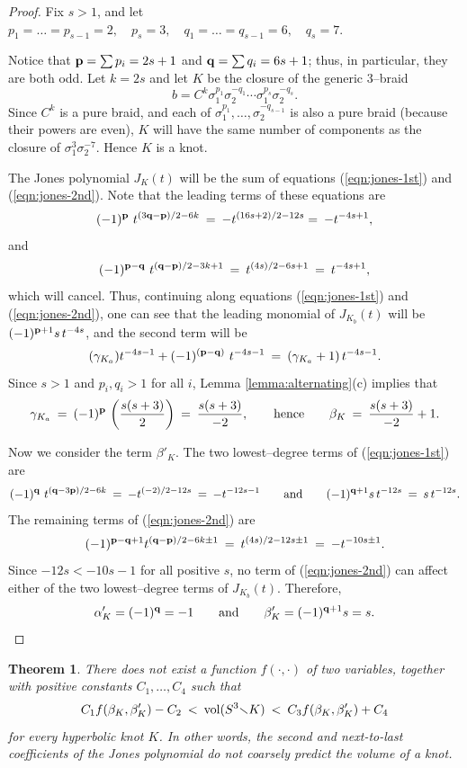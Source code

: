 \documentclass[11pt]{amsart}
\renewcommand{\setminus}{{\smallsetminus}}
\newcommand{\vol}{{\rm vol}}
\newcommand{\p}{{\bf p}}
\newcommand{\q}{{\bf q}}
\theoremstyle{plain}
\newtheorem{theorem}{Theorem}[section]
\theoremstyle{definition}
\begin{document}
\begin{proof} 
Fix $s>1$, and let
$p_1 = \ldots = p_{s-1} = 2, \quad p_s = 3, \quad
q_1 = \ldots = q_{s-1} = 6, \quad q_s = 7.$

Notice that $\p = \sum p_i=2s+1$ and $\q = \sum
q_i=6s+1$; thus, in particular, they are both odd.  Let $k=2s$
and let $K$ be the closure of the generic $3$--braid
$$b= C^k \sigma_1^{p_1} \sigma_2^{-q_1} \cdots \sigma_1^{p_s}
\sigma_2^{-q_s}.$$
%
Since $C^k$ is a pure braid, and each of $\sigma_1^{p_1}, \ldots,
\sigma_2^{-q_{s-1}}$ is also a pure braid (because their powers are
even), $K$ will have the same number of components as the closure of
$\sigma_1^{3} \sigma_2^{-7}$.  Hence $K$ is a knot.
 
The Jones polynomial $J_K(t)$ will be the sum of equations
(\ref{eqn:jones-1st}) and (\ref{eqn:jones-2nd}). Note that the leading
terms of these equations are
$$(-1)^{\p} \ t^{(3\q-\p)/2-6k} \: = \: -t^{(16s+2)/2-12s} =\: - t^{-4s+1}, $$
%
and
$$(-1)^{\p-\q} \  t^{(\q-\p)/2-3k+1} \: = \: t^{(4s)/2-6s+1} \: = \: t^{-4s+1},$$
%
which will cancel.  Thus, continuing along equations
(\ref{eqn:jones-1st}) and (\ref{eqn:jones-2nd}), one can see that the
leading monomial of $J_{K_b}(t)$ will be $(-1)^{\p+1} s\, t^{-4s}$,
and the second term will be
$$(\gamma_{K_a}) t^{-4s-1} + (-1)^{(\p-\q)}\ t^{-4s-1} \: =
\: \left( \gamma_{K_a} + 1 \right) t^{-4s-1}.$$
Since $s>1$ and $p_i, q_i > 1$ for all $i$, Lemma \ref{lemma:alternating}(c) implies that
$$ \gamma_{K_a} \:=\: (-1)^{\p}\, \left( \frac{s(s+3)}{2} \right) 
\:=\: \frac{s(s+3)}{-2},
\qquad \mbox{hence} \qquad
\beta_K \: = \:  \frac{s(s+3)}{-2}+1.$$

Now we consider the term $\beta'_K$.
The two lowest--degree terms of (\ref{eqn:jones-1st})  are
$$(-1)^{\q} \ t^{(\q-3\p)/2 -6k} \: = \: - t^{(-2)/2 - 12s }  \: = \: -t^{-12s-1} \qquad
\mbox{and} \qquad
(-1)^{\q +1}s \, t^{-12s} \: = \: s \, t^{-12s}.
$$
The remaining terms of  (\ref{eqn:jones-2nd}) are
$$(-1)^{\p-\q+1} t^{(\q-\p)/2-6k\pm 1} \: =\: 
t^{(4s)/2 - 12s \pm 1} \: = \:  -t^{-10s \pm 1} .$$
Since  $-12s < -10s-1$ for all positive $s$, no term of (\ref{eqn:jones-2nd}) can affect either
of the two lowest--degree terms of $J_{K_b}(t)$. Therefore,
$$\alpha'_K = (-1)^{\q} = -1 \qquad \mbox{and} \qquad
\beta'_K = (-1)^{\q+1} s = s.$$

\vspace{-3ex}
\end{proof}


\begin{theorem} \label{thm:counterexample}
There does not exist a function $f(\cdot, \cdot)$ of two variables,
together with positive constants $C_1, \ldots, C_4$ such that
$$C_1 f(\beta_K, \beta'_K) - C_2 \: < \: \vol(S^3\setminus K) \:<\: C_3
f(\beta_K, \beta'_K) + C_4$$
for every hyperbolic knot $K$.
In other words, the second and
next-to-last coefficients of the Jones polynomial do not coarsely
predict the volume of a knot.
\end{theorem}
\end{document}
